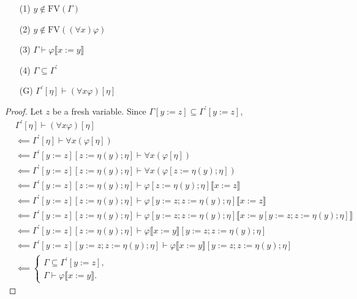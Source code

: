 \documentclass[12pt]{paper}
\begin{document}
\begin{enumerate}
\item [(1)] $y \notin \mathrm{FV} \left( \Gamma \right)$
\item [(2)] $y \notin \mathrm{FV} \left( \left( \forall x \right) \varphi \right)$
\item [(3)] $\Gamma \vdash \varphi \llbracket x := y \rrbracket$
\item [(4)] $\Gamma \subseteq \Gamma^{\prime}$
\item [(G)] $\Gamma^{\prime} \left[ \eta \right] \vdash \left( \forall x \varphi \right) \left[ \eta \right]$
\end{enumerate}
\begin{proof} Let $z$ be a fresh variable. Since $\Gamma \left[ y := z \right] \subseteq \Gamma^{\prime} \left[ y := z \right]$,
\begin{align*}
& \Gamma^{\prime} \left[ \eta \right] \vdash \left( \forall x \varphi \right) \left[ \eta \right] \\
& \impliedby \Gamma^{\prime} \left[ \eta \right] \vdash \forall x \left( \varphi \left[ \eta \right] \right) \\
& \impliedby \Gamma^{\prime} \left[ y := z \right] \left[ z := \eta \left( y \right) ; \eta \right] \vdash \forall x \left( \varphi \left[ \eta \right] \right) \\
& \impliedby \Gamma^{\prime} \left[ y := z \right] \left[ z := \eta \left( y \right) ; \eta \right] \vdash \forall x \left( \varphi \left[ z := \eta \left( y \right) ; \eta \right] \right) \\
& \impliedby \Gamma^{\prime} \left[ y := z \right] \left[ z := \eta \left( y \right) ; \eta \right] \vdash \varphi \left[ z := \eta \left( y \right) ; \eta \right] \llbracket x := z \rrbracket \\
& \impliedby \Gamma^{\prime} \left[ y := z \right] \left[ z := \eta \left( y \right) ; \eta \right] \vdash \varphi \left[ y := z ; z := \eta \left( y \right) ; \eta \right] \llbracket x := z \rrbracket \\
& \impliedby \Gamma^{\prime} \left[ y := z \right] \left[ z := \eta \left( y \right) ; \eta \right] \vdash \varphi \left[ y := z ; z := \eta \left( y \right) ; \eta \right] \llbracket x := y \left[ y := z ; z := \eta \left( y \right) ; \eta \right] \rrbracket \\
& \impliedby \Gamma^{\prime} \left[ y := z \right] \left[ z := \eta \left( y \right) ; \eta \right] \vdash \varphi \llbracket x := y \rrbracket \left[ y := z ; z := \eta \left( y \right) ; \eta \right] \\
& \impliedby \Gamma^{\prime} \left[ y := z \right] \left[ y := z ; z := \eta \left( y \right) ; \eta \right] \vdash \varphi \llbracket x := y \rrbracket \left[ y := z ; z := \eta \left( y \right) ; \eta \right] \\
& \impliedby
\begin{cases}
\Gamma \subseteq \Gamma^{\prime} \left[ y := z \right] , \\
\Gamma \vdash \varphi \llbracket x := y \rrbracket .
\end{cases}
\end{align*}
\end{proof}
\end{document}
